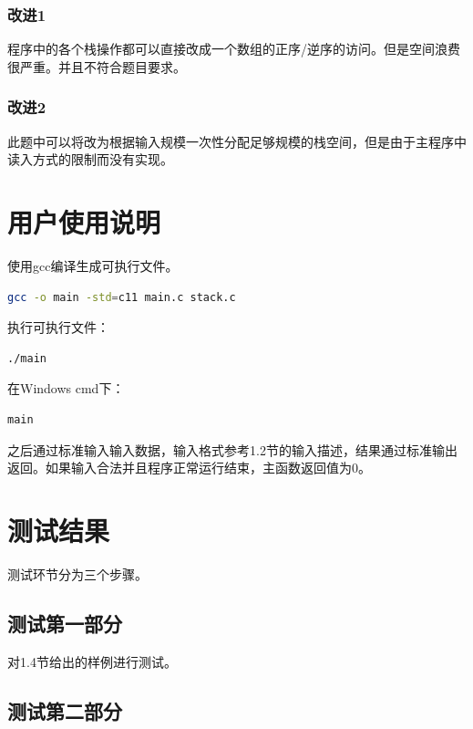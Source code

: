 \documentclass{article}
\begin{document}
\subsubsection{改进1}

程序中的各个栈操作都可以直接改成一个数组的正序/逆序的访问。但是空间浪费很严重。并且不符合题目要求。

\subsubsection{改进2}

此题中可以将改为根据输入规模一次性分配足够规模的栈空间，但是由于主程序中读入方式的限制而没有实现。

\section{用户使用说明}

使用gcc编译生成可执行文件。

\begin{lstlisting}[language={bash},
    basicstyle=\small\consolas]
gcc -o main -std=c11 main.c stack.c
\end{lstlisting}

执行可执行文件：

\begin{lstlisting}[language={bash},
    basicstyle=\small\consolas]
./main
\end{lstlisting}

在Windows cmd下：

\begin{lstlisting}[language={bash},
    basicstyle=\small\consolas]
main
\end{lstlisting}

之后通过标准输入输入数据，输入格式参考1.2节的输入描述，结果通过标准输出返回。如果输入合法并且程序正常运行结束，主函数返回值为0。

\section{测试结果}

测试环节分为三个步骤。

\subsection{测试第一部分}

对1.4节给出的样例进行测试。

\subsection{测试第二部分}
\end{document}
